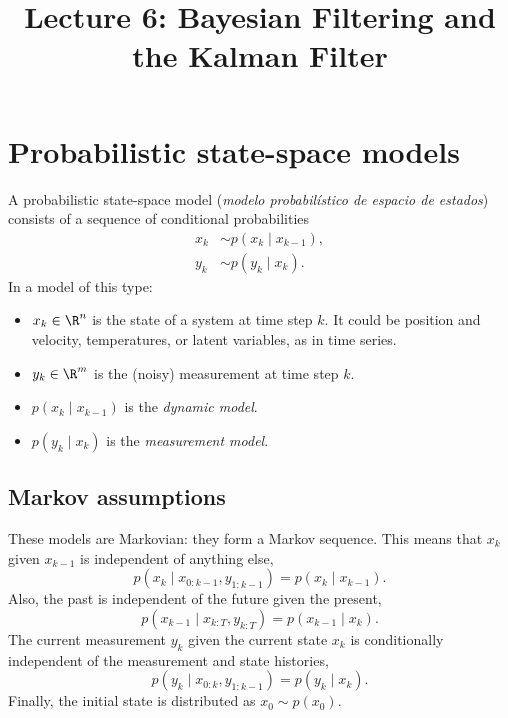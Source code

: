 
\title{Lecture 6: Bayesian Filtering and the Kalman Filter}
\author{}\date{}
\newcommand{\mt}{\tilde m}
\newcommand{\Pt}{\tilde P}
\newcommand{\lead}[1]{\medskip\noindent\textbf{#1}\ }


\maketitle

\section{Probabilistic state-space models}
A probabilistic state-space model (\emph{modelo probabilístico de espacio de estados}) consists of a sequence of conditional probabilities
\begin{align}
  x_k &\sim p(x_k \mid x_{k-1}), \label{eq:din}\\
  y_k &\sim p(y_k \mid x_k). \label{eq:med}
\end{align}
In a model of this type:
\begin{itemize}[nosep]
  \item $x_k \in \R^n$ is the state of a system at time step $k$. It could be position and velocity, temperatures, or latent variables, as in time series.
  \item $y_k \in \R^m$ is the (noisy) measurement at time step $k$.
  \item $p(x_k \mid x_{k-1})$ is the \emph{dynamic model}.
  \item $p(y_k \mid x_k)$ is the \emph{measurement model}.
\end{itemize}

\subsection{Markov assumptions}
These models are Markovian: they form a Markov sequence. This means that $x_k$ given $x_{k-1}$ is independent of anything else,
\begin{equation}
  p(x_k \mid x_{0:k-1}, y_{1:k-1}) = p(x_k \mid x_{k-1}). \label{eq:markov1}
\end{equation}
Also, the past is independent of the future given the present,
\begin{equation}
  p(x_{k-1} \mid x_{k:T}, y_{k:T}) = p(x_{k-1} \mid x_k). \label{eq:markov2}
\end{equation}
The current measurement $y_k$ given the current state $x_k$ is conditionally independent of the measurement and state histories,
\begin{equation}
  p(y_k \mid x_{0:k}, y_{1:k-1}) = p(y_k \mid x_k). \label{eq:indcond}
\end{equation}
Finally, the initial state is distributed as $x_0 \sim p(x_0)$.

